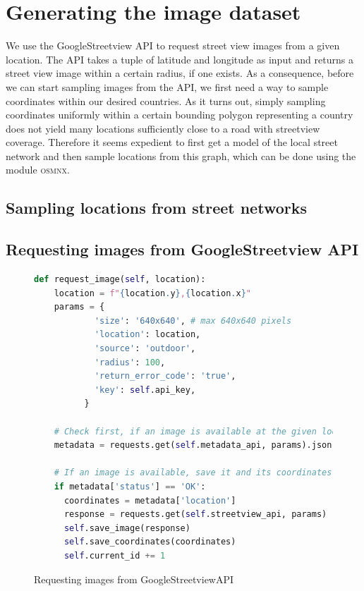\documentclass{article}
\begin{document}
\section{Generating the image dataset}

We use the GoogleStreetview API to request street view images from a given location.
The API takes a tuple of latitude and longitude as input and returns a street view image within a certain radius, if one exists.
As a consequence, before we can start sampling images from the API, we first need a way to sample coordinates within our desired countries.
As it turns out, simply sampling coordinates uniformly within a certain bounding polygon representing a country does not yield many locations sufficiently close to a road with streetview coverage. 
Therefore it seems expedient to first get a model of the local street network and then sample locations from this graph, which can be done using the module \textsc{osmnx}.



\subsection{Sampling locations from street networks}

\subsection{Requesting images from GoogleStreetview API}

\begin{figure}
  \begin{lstlisting}[language=Python]
    def request_image(self, location):
    location = f"{location.y},{location.x}"
    params = {
            'size': '640x640', # max 640x640 pixels
            'location': location,
            'source': 'outdoor',
            'radius': 100,
            'return_error_code': 'true',
            'key': self.api_key,
          }

    # Check first, if an image is available at the given location
    metadata = requests.get(self.metadata_api, params).json()

    # If an image is available, save it and its coordinates in the respective folder
    if metadata['status'] == 'OK':
      coordinates = metadata['location']
      response = requests.get(self.streetview_api, params)
      self.save_image(response)
      self.save_coordinates(coordinates)
      self.current_id += 1
  \end{lstlisting}
  \caption{Requesting images from GoogleStreetviewAPI}
\end{figure}
\end{document}
